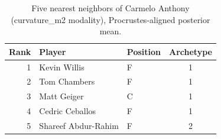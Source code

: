 \begin{table}[htbp]
  \centering\small
  \begin{tabular}{rllc}
    \toprule
    Rank & Player & Position & Archetype \\
    \midrule
    1 & Kevin Willis & F & 1 \\
    2 & Tom Chambers & F & 1 \\
    3 & Matt Geiger & C & 1 \\
    4 & Cedric Ceballos & F & 1 \\
    5 & Shareef Abdur-Rahim & F & 2 \\
    \bottomrule
  \end{tabular}
  \caption{Five nearest neighbors of Carmelo Anthony (curvature_m2 modality), Procrustes-aligned posterior mean.}
  \label{tab:Carmelo_Anthony_neighbors_curvature_m2}
\end{table}

